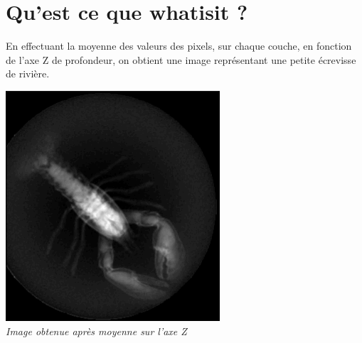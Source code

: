 \documentclass[a4paper,11pt]{article}
\begin{document}
\newpage 
\section{Qu'est ce que whatisit ?}
En effectuant la moyenne des valeurs des pixels, sur chaque couche, en fonction de l'axe Z de profondeur, on obtient une image représentant une petite écrevisse de rivière.
\begin{center}
\includegraphics[scale=0.7]{ecrevisse.png}\\
\textit{Image obtenue après moyenne sur l'axe Z}
\end{center}


\newpage 
\end{document}

